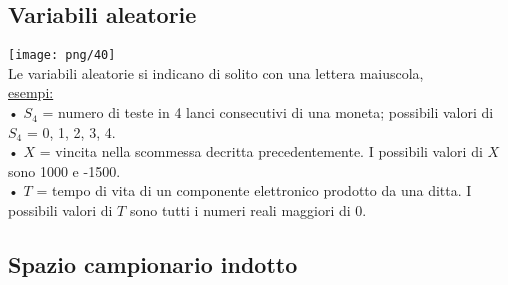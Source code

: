 \documentclass[12pt, letterpaper]{article}
\begin{document}
\subsection{Variabili aleatorie}

\texttt{[image: png/40]}
\\
Le variabili aleatorie si indicano di solito con una lettera maiuscola,
\\
\underline{esempi:}
\\
• $S_4$ = numero di teste in 4 lanci consecutivi di una moneta; possibili valori di $S_4$ = 0, 1, 2, 3, 4.
\\
• $X$ = vincita nella scommessa decritta precedentemente. I possibili valori di $X$ sono 1000 e -1500.
\\
• $T$ = tempo di vita di un componente elettronico prodotto da una ditta. I possibili valori di $T$ sono tutti i numeri reali maggiori di 0.

\subsection{Spazio campionario indotto}
\end{document}
